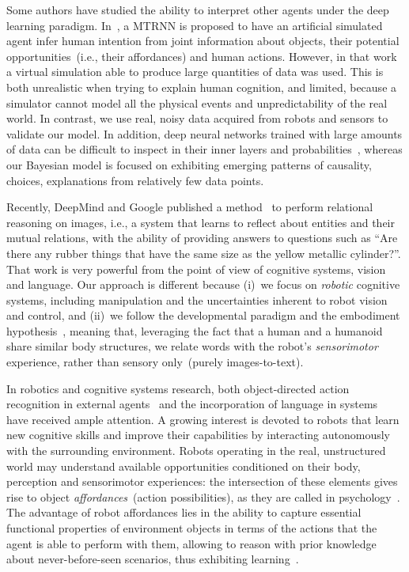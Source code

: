 Some authors have studied the ability to interpret other agents under the deep learning paradigm.
In~\cite{kim:2017:nn}, a \ac{MTRNN} is proposed to have an artificial simulated agent infer human intention from joint information about objects, their potential opportunities~(i.e., their affordances) and human actions.
However, in that work a virtual simulation able to produce large quantities of data was used.
This is both unrealistic when trying to explain human cognition, and limited, because a simulator cannot model all the physical events and unpredictability of the real world.
In contrast, we use real, noisy data acquired from robots and sensors to validate our model.
In addition, deep neural networks trained with large amounts of data can be difficult to inspect in their inner layers and probabilities~\cite{szegedy:2014:intriguing}, whereas our Bayesian model is focused on exhibiting emerging patterns of causality, choices, explanations from relatively few data points.

Recently, DeepMind and Google published a method~\cite{santoro:2017:relational_reasoning} to perform relational reasoning on images, i.e., a system that learns to reflect about entities and their mutual relations, with the ability of providing answers to questions such as ``Are there any rubber things that have the same size as the yellow metallic cylinder?''.
That work is very powerful from the point of view of cognitive systems, vision and language.
Our approach is different because (i)~we focus on \emph{robotic} cognitive systems, including manipulation and the uncertainties inherent to robot vision and control, and (ii)~we follow the developmental paradigm and the embodiment hypothesis~\cite{lungarella:2003:devrobsurvey}, meaning that, leveraging the fact that a human and a humanoid share similar body structures, we relate words with the robot's \emph{sensorimotor} experience, rather than sensory only~(purely images-to-text).

In robotics and cognitive systems research, both object-directed action recognition in external agents~\cite{koppula:2013:ijrr} and the incorporation of language in \hr{} systems~\cite{harnad:1990,matuszek:2014:aaai} have received ample attention.
A growing interest is devoted to robots that learn new cognitive skills and improve their capabilities by interacting autonomously with the surrounding environment.
Robots operating in the real, unstructured world may understand available opportunities conditioned on their body, perception and sensorimotor experiences: the intersection of these elements gives rise to object \emph{affordances}~(action possibilities), as they are called in psychology~\cite{gibson:2014}.
The advantage of robot affordances lies in the ability to capture essential functional properties of environment objects in terms of the actions that the agent is able to perform with them, allowing to reason with prior knowledge about never-before-seen scenarios, thus exhibiting learning~\cite{montesano:2008,jamone:2016:tcds}.

